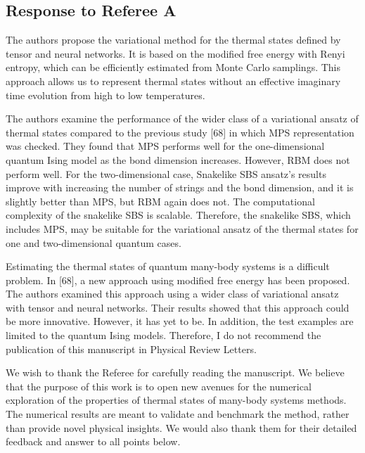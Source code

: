 \documentclass[a4paper,12pt]{article}
\newenvironment{referee}[1]
{\noindent {\bf Referee #1}}
{\vspace{1em}}
\newenvironment{response}
{\noindent \color{blue!40!black}{\bf Response}}
{\vspace{1em}}
\begin{document}
\subsection*{Response to Referee A}
\begin{referee}{A}
	The authors propose the variational method for the thermal states defined by tensor and neural networks.
	It is based on the modified free energy with Renyi entropy, which can be efficiently estimated from Monte Carlo samplings.
	This approach allows us to represent thermal states without an effective imaginary time evolution from high to low temperatures.

	The authors examine the performance of the wider class of a variational ansatz of thermal states compared to the previous study [68] in which MPS representation was checked.
	They found that MPS performs well for the one-dimensional quantum Ising model as the bond dimension increases.
	However, RBM does not perform well.
	For the two-dimensional case, Snakelike SBS ansatz's results improve with increasing the number of strings and the bond dimension, and it is slightly better than MPS, but RBM again does not.
	The computational complexity of the snakelike SBS is scalable.
	Therefore, the snakelike SBS, which includes MPS, may be suitable for the variational ansatz of the thermal states for one and two-dimensional quantum cases.

	Estimating the thermal states of quantum many-body systems is a difficult problem.
	In [68], a new approach using modified free energy has been proposed.
	The authors examined this approach using a wider class of variational ansatz with tensor and neural networks.
	Their results showed that this approach could be more innovative.
	However, it has yet to be.
	In addition, the test examples are limited to the quantum Ising models.
	Therefore, I do not recommend the publication of this manuscript in Physical Review Letters.
\end{referee}

\begin{response}
	We wish to thank the Referee for carefully reading the manuscript.
	We believe that the purpose of this work is to open new avenues for the numerical exploration of the properties of thermal states of many-body systems methods.
	The numerical results are meant to validate and benchmark the method, rather than provide novel physical insights.
	We would also thank them for their detailed feedback and answer to all points below.
\end{response}
\end{document}
